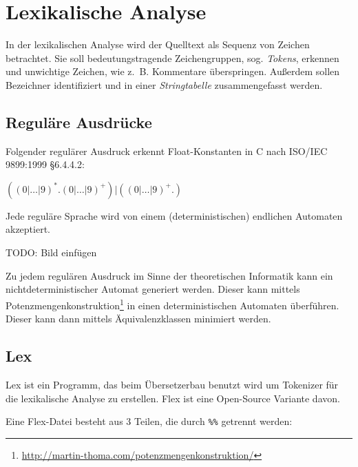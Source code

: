 \section{Lexikalische Analyse}%
In der lexikalischen Analyse wird der Quelltext als Sequenz von Zeichen betrachtet.
Sie soll bedeutungstragende Zeichengruppen, sog. \textit{Tokens},
erkennen und unwichtige Zeichen, wie z.~B. Kommentare überspringen. Außerdem
sollen Bezeichner identifiziert und in einer \textit{Stringtabelle}
zusammengefasst werden.

\begin{beispiel}
\end{beispiel}

\subsection{Reguläre Ausdrücke}
\begin{beispiel}
	Folgender regulärer Ausdruck erkennt Float-Konstanten in C nach
	ISO/IEC 9899:1999 §6.4.4.2:

	$((0|\dots|9)^*.(0|\dots|9)^+)|((0|\dots|9)^+.)$
\end{beispiel}

\begin{satz}
	Jede reguläre Sprache wird von einem (deterministischen) endlichen
	Automaten akzeptiert.
\end{satz}

TODO: Bild einfügen

Zu jedem regulären Ausdruck im Sinne der theoretischen Informatik kann ein 
nichtdeterministischer Automat generiert werden. Dieser kann mittels 
Potenzmengenkonstruktion\footnote{\url{http://martin-thoma.com/potenzmengenkonstruktion/}} 
in einen deterministischen Automaten überführen. Dieser kann dann mittels 
Äquivalenzklassen minimiert werden.


\subsection{Lex}
Lex ist ein Programm, das beim Übersetzerbau benutzt wird um Tokenizer für die
lexikalische Analyse zu erstellen. Flex ist eine Open-Source Variante davon.

Eine Flex-Datei besteht aus 3 Teilen, die durch \texttt{\%\%} getrennt werden:

